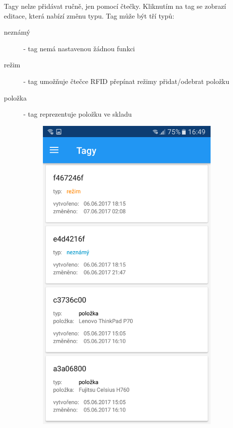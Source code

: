 \documentclass[czech,BP]{thesiskiv}
\begin{document}
Tagy nelze přidávat ručně, jen pomocí čtečky. Kliknutím na tag se zobrazí editace, která nabízí změnu typu. Tag může být tří typů:
\begin{description}
\item [neznámý] - tag nemá nastavenou žádnou funkci
\item [režim] - tag umožňuje čtečce RFID přepínat režimy přidat/odebrat položku
\item [položka] - tag reprezentuje položku ve skladu 
\end{description}
\begin{figure}[H]
	\centering
  \begin{subfigure}[b]{0.3\textwidth}
    \centering
	\includegraphics[width=\textwidth]{../images/client_android/Screenshot_20170607-164958.png}	

\end{subfigure}
\end{figure}
\end{document}

